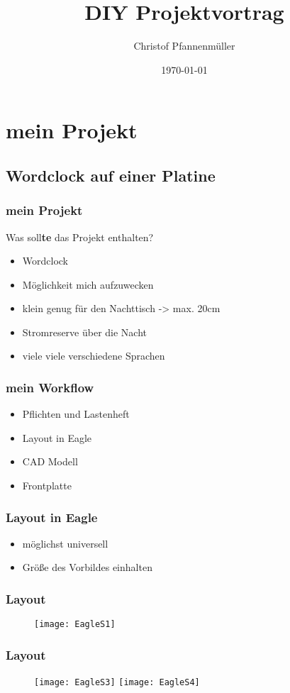 \documentclass{beamer}
\title{DIY Projektvortrag}
\author{Christof Pfannenmüller}
\date{\today}
\begin{document}
\frame{\titlepage} %
\section[Outline]{}
\frame{\tableofcontents}


\section{mein Projekt}
\subsection{ \huge{ Wordclock auf einer Platine}}
\frame
{
  \frametitle{mein  Projekt}
{\Large Was soll\textbf{te} das Projekt enthalten?\\}\par 
\begin{itemize}
\item Wordclock
\item Möglichkeit mich aufzuwecken
\item klein genug für den Nachttisch -> max. 20cm
\item Stromreserve über die Nacht
\item viele viele verschiedene Sprachen
\end{itemize}
}



\frame
{
  \frametitle{mein  Workflow} 
  \begin{itemize}
\item Pflichten und Lastenheft
\item Layout in Eagle
\item CAD Modell
\item Frontplatte
\end{itemize}
} 
 


\frame
{
  \frametitle{Layout in Eagle}
   \begin{itemize}
\item möglichst universell
\item Größe des Vorbildes einhalten
\end{itemize}
} 

\frame
{
  \frametitle{Layout}
\begin{figure}[tb]
\centering \texttt{[image: EagleS1]} 
\end{figure}
} 

\frame
{
  \frametitle{Layout}

\begin{figure}
     \centering
     \texttt{[image: EagleS3]}
     \texttt{[image: EagleS4]}
\end{figure}

} 
 
\end{document}
